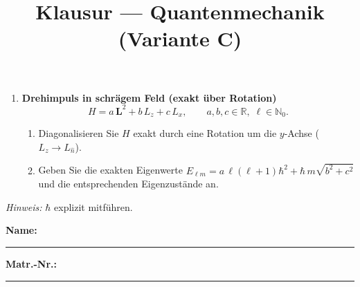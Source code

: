 \documentclass[11pt,a4paper]{article}
\begin{document}
\begin{enumerate}
\item \textbf{Drehimpuls in schrägem Feld (exakt über Rotation)}\\
\[
H=a\,\mathbf L^2+b\,L_z+c\,L_x,\qquad a,b,c\in\mathbb R,\; \ell\in\mathbb N_0.
\]
\begin{enumerate}
  \item Diagonalisieren Sie \(H\) exakt durch eine Rotation um die \(y\)-Achse (\(L_z\to L_{\hat n}\)).
  \item Geben Sie die exakten Eigenwerte \(E_{\ell m}=a\,\ell(\ell+1)\hbar^2+\hbar\,m\sqrt{b^2+c^2}\) und die entsprechenden Eigenzustände an.
\end{enumerate}

\end{enumerate}
\vfill
\noindent\textit{Hinweis:} \(\hbar\) explizit mitführen.


\pagebreak


\title{Klausur — Quantenmechanik (Variante C)}
\author{}\date{}

\noindent\textbf{Name:} \rule{0.6\linewidth}{0.4pt}\hfill\textbf{Matr.-Nr.:} \rule{0.25\linewidth}{0.4pt}

\vspace{1em}
\end{document}
